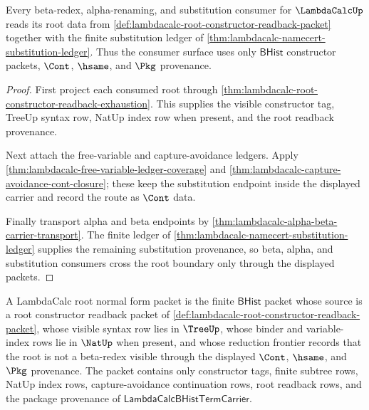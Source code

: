 \begin{theorem}
\label{thm:lambdacalc-root-beta-alpha-consumer-threshold}
Every beta-redex, alpha-renaming, and substitution consumer for
$\LambdaCalcUp$ reads its root data from
\autoref{def:lambdacalc-root-constructor-readback-packet} together with the
finite substitution ledger of
\autoref{thm:lambdacalc-namecert-substitution-ledger}. Thus the consumer
surface uses only $\mathsf{BHist}$ constructor packets, $\Cont$, $\hsame$, and
$\Pkg$ provenance.
\end{theorem}
\begin{proof}
First project each consumed root through
\autoref{thm:lambdacalc-root-constructor-readback-exhaustion}. This supplies
the visible constructor tag, TreeUp syntax row, NatUp index row when present,
and the root readback provenance.

Next attach the free-variable and capture-avoidance ledgers. Apply
\autoref{thm:lambdacalc-free-variable-ledger-coverage} and
\autoref{thm:lambdacalc-capture-avoidance-cont-closure}; these keep the
substitution endpoint inside the displayed carrier and record the route as
$\Cont$ data.

Finally transport alpha and beta endpoints by
\autoref{thm:lambdacalc-alpha-beta-carrier-transport}. The finite ledger of
\autoref{thm:lambdacalc-namecert-substitution-ledger} supplies the remaining
substitution provenance, so beta, alpha, and substitution consumers cross the
root boundary only through the displayed packets.
\end{proof}

\begin{definition}
\label{def:lambdacalc-root-normal-form-packet}
A LambdaCalc root normal form packet is the finite $\mathsf{BHist}$ packet
whose source is a root constructor readback packet of
\autoref{def:lambdacalc-root-constructor-readback-packet}, whose visible
syntax row lies in $\TreeUp$, whose binder and variable-index rows lie in
$\NatUp$ when present, and whose reduction frontier records that the root is
not a beta-redex visible through the displayed $\Cont$, $\hsame$, and $\Pkg$
provenance. The packet contains only constructor tags, finite subtree rows,
NatUp index rows, capture-avoidance continuation rows, root readback rows, and
the package provenance of $\mathsf{LambdaCalcBHistTermCarrier}$.
\end{definition}

